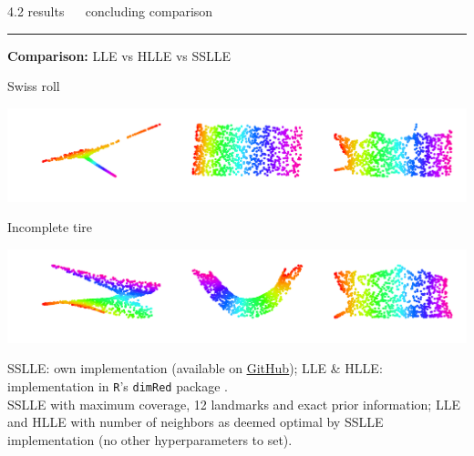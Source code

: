 \documentclass[11pt, compress, t, notes = noshow, xcolor = table, 
aspectratio = 1610]{beamer}
\begin{document}
\LARGE
\begin{frame}{\textcolor{gray!90}{4.2 results} ~~ concluding comparison}
\normalsize
\vspace{-0.5cm}
\noindent \textcolor{gray!90}{\rule{\textwidth}{1pt}}
\smallskip

\textbf{Comparison:} LLE vs HLLE vs SSLLE

\vspace{0.3cm}

\begin{minipage}[c]{0.2\textwidth}
  Swiss roll
\end{minipage}%
\begin{minipage}[c]{0.8\textwidth}
  \includegraphics[trim = 0 0 0 0, clip, %
    width = \textwidth]{figures/comparison_swiss_roll}
\end{minipage}

\vspace{0.3cm}   

\begin{minipage}[c]{0.2\textwidth}
  Incomplete tire
\end{minipage}%
\begin{minipage}[c]{0.8\textwidth}
  \includegraphics[trim = 0 0 0 0, clip, %
    width = \textwidth]{figures/comparison_incomplete_tire}
\end{minipage}


\vfill

\scriptsize
SSLLE: own implementation (available on  
\href{https://github.com/lisa-wm/manifold-lle/tree/main/2_code}
{\underline{GitHub}}); 
LLE \& HLLE: implementation in \texttt{R}'s \texttt{dimRed} 
package \citep{pkgdimred}. \\
SSLLE with maximum coverage, 12 landmarks and exact prior information;
LLE and HLLE with number of neighbors as deemed optimal by SSLLE implementation 
(no other hyperparameters to set).

\end{frame}
\end{document}
